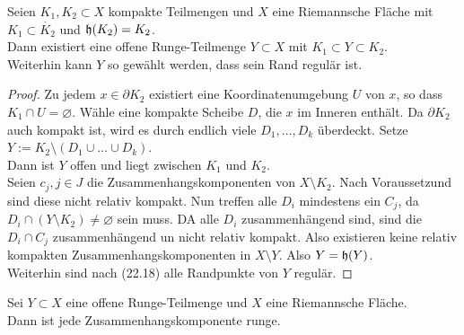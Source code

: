 \begin{lemma}
  \label{lemma:zwischen-runge}
  Seien $K_1, K_2 \subset X$ kompakte Teilmengen und $X$ eine
  Riemannsche Fläche mit $K_1 \subset \mathring{K_2}$ und $\mathfrak{h}(K_2)
  = K_2$. \\
  Dann existiert eine offene Runge-Teilmenge $Y \subset X$ mit $K_1
  \subset Y \subset K_2$. \\
  Weiterhin kann $Y$ so gewählt werden, dass sein Rand regulär ist.
\end{lemma}

\begin{proof}
  Zu jedem $x \in \partial K_2$ existiert eine Koordinatenumgebung $U$
  von $x$, so dass $K_1 \cap U = \varnothing$. Wähle eine kompakte
  Scheibe $D$, die $x$ im Inneren enthält. Da $\partial K_2$ auch
  kompakt ist, wird es durch endlich viele $D_1, \dots, D_k$
  überdeckt. Setze $Y := K_2 \setminus (D_1 \cup \dots \cup D_k)$. \\
  Dann ist $Y$ offen und liegt zwischen $K_1$ und $K_2$. \\
  Seien $c_j, j \in J$ die Zusammenhangskomponenten von $X \setminus
  K_2$. Nach Voraussetzund sind diese nicht relativ kompakt. Nun
  treffen alle $D_i$ mindestens ein $C_j$, da $D_i \cap (Y \setminus
  K_2) \neq \varnothing$ sein muss. DA alle $D_i$ zusammenhängend
  sind, sind die $D_i \cap C_j$ zusammenhängend un nicht relativ
  kompakt. Also existieren keine relativ kompakten
  Zusammenhangskomponenten in $X\setminus Y$. Also $Y = \mathfrak{h}(Y)$. \\
  Weiterhin sind nach (22.18) alle Randpunkte von $Y$ regulär.
\end{proof}

\begin{thm}
  \label{thm:runge-zshkomp}
  Sei $Y \subset X$ eine offene Runge-Teilmenge und $X$ eine
  Riemannsche Fläche. \\
  Dann ist jede Zusammenhangskomponente runge.
\end{thm}

